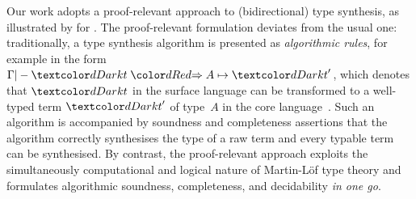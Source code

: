 Our work adopts a proof-relevant approach to (bidirectional) type synthesis, as illustrated by \citet{Wadler2022} for \PCF.
The proof-relevant formulation deviates from the usual one: traditionally, a type synthesis algorithm is presented as \emph{algorithmic rules}, for example in the form $\Gamma |- \isTerm{t} \syn A \mapsto \isTerm{t}'$, which denotes that $\isTerm{t}$ in the surface language
can be transformed to a well-typed term $\isTerm{t}'$ of type~$A$ in the core language~\cite{Pierce2000}.
Such an algorithm is accompanied by soundness and completeness assertions that the algorithm correctly synthesises the type of a raw term and every typable term can be synthesised.
By contrast, the proof-relevant approach exploits the simultaneously computational and logical nature of Martin-L\"of type theory and formulates algorithmic soundness, completeness, and decidability \emph{in one go}.

